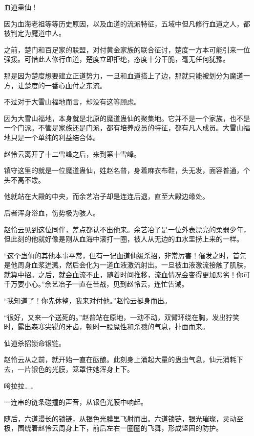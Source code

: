 
\begin{this_body}

血道蛊仙！

因为血海老祖等等历史原因，以及血道的流派特征，五域中但凡修行血道之人，都被判定为魔道中人。

之前，楚门和百足家的联盟，对付黄金家族的联合征讨，楚度一方本可能引来一位强援。可惜此人修行血道，楚度立即拒绝，态度十分干脆，毫无任何犹豫。

那是因为楚度想要建立正道势力，一旦和血道搭上了边，那就只能被划分为魔道一方，让楚度的一番心血付之东流。

不过对于大雪山福地而言，却没有这等顾虑。

因为大雪山福地，本身就是北原的魔道蛊仙的聚集地。它并不是一个家族，也不是一个门派。不管是家族还是门派，都有培养成员的特征，都有凡人成员。大雪山福地只是一个单纯的利益结合体。

赵怜云离开了十二雪峰之后，来到第十雪峰。

镇守这里的就是一位魔道蛊仙，姓赵名普，身着麻衣布鞋，头无发，面容普通，个头不高不矮。

他就站在大殿的中央，而余艺冶子却是连连后退，直至大殿边缘处。

后者浑身浴血，伤势极为骇人。

赵怜云见到这位同伴，差点都认不出他来。余艺冶子是一位外表漂亮的柔弱少年，但此刻的他就好像是刚从血海中滚打一圈，被人从无边的血水里捞上来的一样。

“这个蛊仙的其他本事平常，但有一记血道仙级杀招，非常厉害！催发之时，首先是他周身血浆迸溅，然后会化为一道血液激流射出。一旦被血液激流接触了肌肤，就算中招。之后，就会血流不止，随着时间推移，流血情况会变得更加恶劣！你可千万要小心。”余艺冶子一直在苦战，见到赵怜云，连忙告诫。

“我知道了！你先休整，我来对付他。”赵怜云挺身而出。

“很好，又来一个送死的。”赵普站在原地，一动不动，双臂环绕在胸，发出狞笑时，露出森寒尖锐的牙齿，顿时一股魔性和杀戮的气息，扑面而来。

仙道杀招锁命银链。

赵怜云从之前，就开始一直在酝酿。此刻身上涌起大量的蛊虫气息，仙元消耗下去，一片银色的光膜，笼罩住她浑身上下。

咵拉拉……

一连串的链条碰撞的声音，从银色光膜中响起。

随后，六道漫长的锁链，从银色光膜里飞射而出。六道锁链，银光璀璨，灵动至极，围绕着赵怜云周身上下，前后左右一圈圈的飞舞，形成坚固的防护。


\end{this_body}
